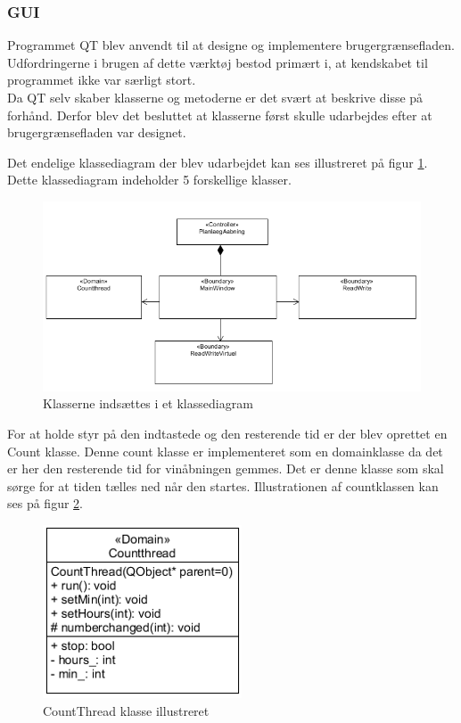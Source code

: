 \subsubsection{GUI}
Programmet QT blev anvendt til at designe og implementere brugergrænsefladen. Udfordringerne i brugen af dette værktøj bestod primært i, at kendskabet til programmet ikke var særligt stort. \\

Da QT selv skaber klasserne og metoderne er det svært at beskrive disse på forhånd. Derfor blev det besluttet at klasserne først skulle udarbejdes efter at brugergrænsefladen var designet.

Det endelige klassediagram der blev udarbejdet kan ses illustreret på figur \ref{kd}. Dette klassediagram indeholder 5 forskellige klasser.

\begin{figure}[H]
	\centerline{\includegraphics[scale=0.6]{tex/Design/GUI/Fotos/Tom_klassediagram_GUI}}
	\caption{Klasserne indsættes i et klassediagram}
	\label{kd}
\end{figure}


For at holde styr på den indtastede og den resterende tid er der blev oprettet en Count klasse. Denne count klasse er implementeret som en domainklasse da det er her den resterende tid for vinåbningen gemmes. Det er denne klasse som skal sørge for at tiden tælles ned når den startes. Illustrationen af countklassen kan ses på figur \ref{CT_CD}.

\begin{figure}[H]
	\centerline{\includegraphics[scale=1]{tex/Design/GUI/Fotos/CountThread}}
	\caption{CountThread klasse illustreret}
	\label{CT_CD}
\end{figure}

